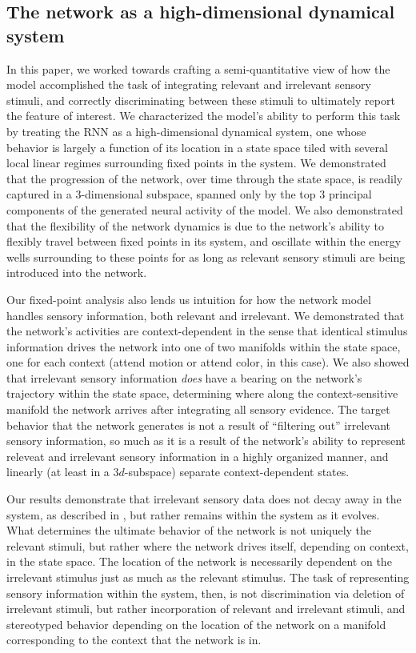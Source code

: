 \documentclass[12pt,a4paper,final]{iopart}
\begin{document}
\subsection{The network as a high-dimensional dynamical system}
In this paper, we worked towards crafting a semi-quantitative view of how the model accomplished the task of integrating relevant and irrelevant sensory stimuli, and correctly discriminating between these stimuli to ultimately report the feature of interest. We characterized the model's ability to perform this task by treating the RNN as a high-dimensional dynamical system, one whose behavior is largely a function of its location in a state space tiled with several local linear regimes surrounding fixed points in the system. We demonstrated that the progression of the network, over time through the state space, is readily captured in a $3$-dimensional subspace, spanned only by the top $3$ principal components of the generated neural activity of the model. We also demonstrated that the flexibility of the network dynamics is due to the network's ability to flexibly travel between fixed points in its system, and oscillate within the energy wells surrounding to these points for as long as relevant sensory stimuli are being introduced into the network.

Our fixed-point analysis also lends us intuition for how the network model handles sensory information, both relevant and irrelevant. We demonstrated that the network's activities are context-dependent in the sense that identical stimulus information drives the network into one of two manifolds within the state space, one for each context (attend motion or attend color, in this case). We also showed that irrelevant sensory information \emph{does} have a bearing on the network's trajectory within the state space, determining where along the context-sensitive manifold the network arrives after integrating all sensory evidence. The target behavior that the network generates is not a result of ``filtering out'' irrelevant sensory information, so much as it is a result of the network's ability to represent releveat and irrelevant sensory information in a highly organized manner, and linearly (at least in a $3d$-subspace) separate context-dependent states.

Our results demonstrate that irrelevant sensory data does not decay away in the system, as described in \cite{BarakSussillo}, but rather remains within the system as it evolves. What determines the ultimate behavior of the network is not uniquely the relevant stimuli, but rather where the network drives itself, depending on context, in the state space. The location of the network is necessarily dependent on the irrelevant stimulus just as much as the relevant stimulus. The task of representing sensory information within the system, then, is not discrimination via deletion of irrelevant stimuli, but rather incorporation of relevant and irrelevant stimuli, and stereotyped behavior depending on the location of the network on a manifold corresponding to the context that the network is in.
\end{document}
